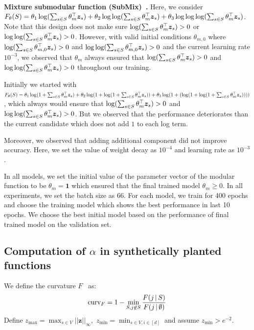\documentclass{article}
\newcommand{\xhdr}[1]{\noindent\textbf{#1.}}
\renewcommand{\cite}{\citep}
\begin{document}
\xhdr{Mixture submodular function (SubMix)~\cite{tschiatschek2014learning}}  Here, we consider $F_{\theta}(S) = \theta_1 \log(\sum_{s\in S}\theta_m ^\top \bm{z}_s) + \theta_2 \log \log(\sum_{s\in S} \theta_m ^\top \bm{z}_s) + \theta_3  \log \log \log(\sum_{s\in S} \theta_m ^\top \bm{z}_s)$. Note that this design does not make sure 
$ \log(\sum_{s\in S} \theta_m ^\top \bm{z}_s)>0$ or $ \log \log(\sum_{s\in S} \theta_m ^\top \bm{z}_s)>0$. However, with valid initial conditions $\theta_{m,0}$ where $\log(\sum_{s\in S} \theta_{m,0} ^\top \bm{z}_s)>0$ and
$ \log \log(\sum_{s\in S} \theta_{m,0} ^\top \bm{z}_s)>0$ and the current learning rate $10^{-3}$, we observed that $\theta_m$ always ensured that
$\log(\sum_{s\in S} \theta_m ^\top \bm{z}_s)>0$ and
$ \log \log(\sum_{s\in S} \theta_m ^\top \bm{z}_s)>0$ throughout our training. 
 
Initially we started with 
$F_{\theta}(S) = \theta_1 \log(1+\sum_{s\in S}\theta_m ^\top \bm{z}_s) + \theta_2 \log (1+\log(1+\sum_{s\in S} \theta_m ^\top \bm{z}_s)) + \theta_3 \log(1+( \log (1+\log (1+\sum_{s\in S} \theta_m ^\top \bm{z}_s))))$, which always would ensure that $\log(\sum_{s\in S} \theta_m ^\top \bm{z}_s)>0$ and
$ \log \log(\sum_{s\in S} \theta_m ^\top \bm{z}_s)>0$. But we observed that the performance deteriorates than the current candidate which does not add $1$ to each log term. 


Moreover, we observed that adding additional component did not improve accuracy.
Here, we set the value of weight decay as $10^{-4}$ and learning rate as $10^{-3}$.  

In all models, we set the initial value of the  parameter vector of the modular function to be $\theta_m = \bm{1}$ which ensured that the final trained model $\theta_m \ge 0$. In all experiments, we set the batch size as $66$. For each model, we train for 400 epochs and choose the training model which shows the best  performance in last 10 epochs. We choose the best initial model based on the performance of final trained model on the validation set.


 \subsection{Computation of $\alpha$ in synthetically planted functions}
We define the curvature $F$~\cite{vondraksubmodularity} as: 
\begin{align}
    \text{curv}_F =  1-\min_{S, j\not \in S}\frac{F(j\,|\, S)}{F(j\,|\, \emptyset)}
\end{align}
Define  $ z_{\max} = {\max_{s\in V} ||\pmb{z}||_{\infty}}, $ $z_\text{min} =   \min_{s\in V, i \in [d]}$ and assume  $z_{\min} > e^{-2}$.  
\end{document}
